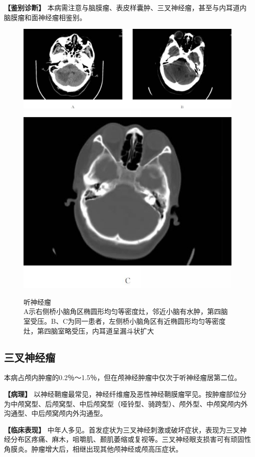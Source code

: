 \textbf{【鉴别诊断】}
本病需注意与脑膜瘤、表皮样囊肿、三叉神经瘤，甚至与内耳道内脑膜瘤和面神经瘤相鉴别。



\begin{figure}[!htbp]
 \centering
 \includegraphics[width=.7\textwidth,height=\textheight,keepaspectratio]{./images/Image00078.jpg}
 \includegraphics[width=.7\textwidth,height=\textheight,keepaspectratio]{./images/Image00079.jpg}
 \captionsetup{justification=centering}
 \caption{听神经瘤\\{\small A示右侧桥小脑角区椭圆形均匀等密度灶，邻近小脑有水肿，第四脑室受压。B、C为同一患者，左侧桥小脑角区有近椭圆形均匀等密度灶，第四脑室略受压，内耳道呈漏斗状扩大}}
 \label{fig2-48}
  \end{figure} 

\subsection{三叉神经瘤}

本病占颅内肿瘤的0.2％～1.5％，但在颅神经肿瘤中仅次于听神经瘤居第二位。

\textbf{【病理】}
以神经鞘瘤最常见，神经纤维瘤及恶性神经鞘膜瘤罕见。按肿瘤部位分为中颅窝型、后颅窝型、中后颅窝型（哑铃型、骑跨型）、颅外型、中颅窝颅内外沟通型、中后颅窝颅内外沟通型。

\textbf{【临床表现】}
中年人多见。首发症状为三叉神经刺激或破坏症状，表现为三叉神经分布区疼痛、麻木，咀嚼肌、颞肌萎缩或复视等。三叉神经眼支损害可有顽固性角膜炎。肿瘤增大后，相继出现其他颅神经或颅高压症状。

